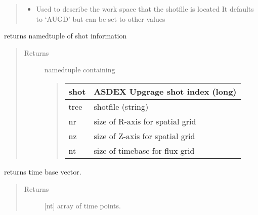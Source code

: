 \documentclass[letterpaper,10pt,english]{sphinxmanual}
\begin{document}
\begin{fulllineitems}
\begin{quote}
\begin{description}
\begin{itemize}
\item {} 
 \textendash{} Used to describe the work space that the shotfile is located
It defaults to ‘AUGD’ but can be set to other values

\end{itemize}

\end{description}\end{quote}

\begin{fulllineitems}
\label{\detokenize{eqtools:eqtools.AUGData.AUGDDData.getInfo}}
returns namedtuple of shot information
\begin{quote}\begin{description}
\item[{Returns}] \leavevmode

namedtuple containing
\begin{quote}


\begin{savenotes}\sphinxattablestart
\centering
\begin{tabulary}{\linewidth}[t]{|T|T|}
\hline

shot
&
ASDEX Upgrage shot index (long)
\\
\hline
tree
&
shotfile (string)
\\
\hline
nr
&
size of R-axis for spatial grid
\\
\hline
nz
&
size of Z-axis for spatial grid
\\
\hline
nt
&
size of timebase for flux grid
\\
\hline
\end{tabulary}
\par
\sphinxattableend\end{savenotes}
\end{quote}


\end{description}\end{quote}

\end{fulllineitems}


\begin{fulllineitems}
\label{\detokenize{eqtools:eqtools.AUGData.AUGDDData.getTimeBase}}
returns time base vector.
\begin{quote}\begin{description}
\item[{Returns}] \leavevmode
{[}nt{]} array of time points.


\end{description}
\end{quote}
\end{fulllineitems}
\end{fulllineitems}
\end{document}
